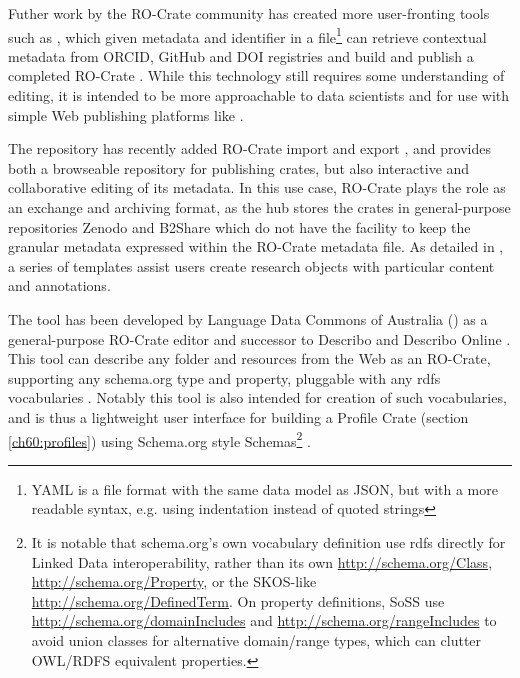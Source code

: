 Futher work by the RO-Crate community has created more user-fronting tools such as , which given metadata and identifier in a  file\footnote{YAML is a file format with the same data model as JSON, but with a more readable syntax, e.g. using indentation instead of quoted strings} can retrieve contextual metadata from ORCID, GitHub and DOI registries and build and publish a completed RO-Crate \cite{ya2ro}.   
While this technology still requires some understanding of editing, it is intended to be more approachable to data scientists and for use with simple Web publishing platforms like .

The repository  \cite{ch5-48} has recently added RO-Crate import and export \cite{Fouilloux 2023}, and provides both a browseable repository for publishing crates, but also interactive and collaborative editing of its metadata. 
In this use case, RO-Crate plays the role as an exchange and archiving format, as the hub stores the crates in general-purpose repositories Zenodo and B2Share which do not have the facility to keep the granular metadata expressed within the RO-Crate metadata file. As detailed in \cite{Fouilloux 2023}, a series of templates assist users create research objects with particular content and annotations. 

The  tool has been developed by Language Data Commons of Australia () as a general-purpose RO-Crate editor and successor to Describo \cite{ch5-78} and Describo Online \cite{ch5-77}. 
This tool can describe any folder and resources from the Web as an RO-Crate, supporting any schema.org type and property, pluggable with any rdfs vocabularies \cite{w3-rdf-schema}. 
Notably this tool is also intended for creation of such vocabularies, and is thus a lightweight user interface for building a Profile Crate (section \vref{ch60:profiles}) using Schema.org style Schemas\footnote{
  It is notable that schema.org's own vocabulary definition use rdfs directly for Linked Data interoperability, 
  rather than its own \url{http://schema.org/Class}, \url{http://schema.org/Property}, or the SKOS-like \url{http://schema.org/DefinedTerm}. 
  On property definitions, SoSS use \url{http://schema.org/domainIncludes} and \url{http://schema.org/rangeIncludes} to avoid union classes for alternative domain/range types, which can clutter OWL/RDFS equivalent properties.} 
.


